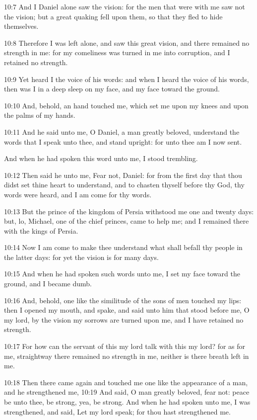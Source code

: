 10:7 And I Daniel alone saw the vision: for the men that were with me
saw not the vision; but a great quaking fell upon them, so that they
fled to hide themselves.

10:8 Therefore I was left alone, and saw this great vision, and there
remained no strength in me: for my comeliness was turned in me into
corruption, and I retained no strength.

10:9 Yet heard I the voice of his words: and when I heard the voice of
his words, then was I in a deep sleep on my face, and my face toward
the ground.

10:10 And, behold, an hand touched me, which set me upon my knees and
upon the palms of my hands.

10:11 And he said unto me, O Daniel, a man greatly beloved, understand
the words that I speak unto thee, and stand upright: for unto thee am
I now sent.

And when he had spoken this word unto me, I stood trembling.

10:12 Then said he unto me, Fear not, Daniel: for from the first day
that thou didst set thine heart to understand, and to chasten thyself
before thy God, thy words were heard, and I am come for thy words.

10:13 But the prince of the kingdom of Persia withstood me one and
twenty days: but, lo, Michael, one of the chief princes, came to help
me; and I remained there with the kings of Persia.

10:14 Now I am come to make thee understand what shall befall thy
people in the latter days: for yet the vision is for many days.

10:15 And when he had spoken such words unto me, I set my face toward
the ground, and I became dumb.

10:16 And, behold, one like the similitude of the sons of men touched
my lips: then I opened my mouth, and spake, and said unto him that
stood before me, O my lord, by the vision my sorrows are turned upon
me, and I have retained no strength.

10:17 For how can the servant of this my lord talk with this my lord?
for as for me, straightway there remained no strength in me, neither
is there breath left in me.

10:18 Then there came again and touched me one like the appearance of
a man, and he strengthened me, 10:19 And said, O man greatly beloved,
fear not: peace be unto thee, be strong, yea, be strong. And when he
had spoken unto me, I was strengthened, and said, Let my lord speak;
for thou hast strengthened me.

